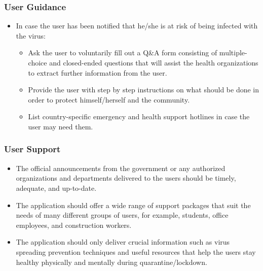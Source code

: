       \subsubsection{User Guidance}
        \begin{itemize}
          \item In case the user has been notified that he/she is at risk of being infected with the virus:
            \begin{itemize}
              \item Ask the user to voluntarily fill out a Q\&A form consisting of multiple-choice and closed-ended questions that will assist the health organizations to extract further information from the user.
              \item Provide the user with step by step instructions on what should be done in order to protect himself/herself and the community.
              \item List country-specific emergency and health support hotlines in case the user may need them.
            \end{itemize}
        \end{itemize}
    
      \subsubsection{User Support}
        \begin{itemize}
          \item The official announcements from the government or any authorized organizations and departments delivered to the users should be timely, adequate, and up-to-date.
          \item The application should offer a wide range of support packages that suit the needs of many different groups of users, for example, students, office employees, and construction workers.
          \item The application should only deliver crucial information such as virus spreading prevention techniques and useful resources that help the users stay healthy physically and mentally during quarantine/lockdown.
        \end{itemize}
    
